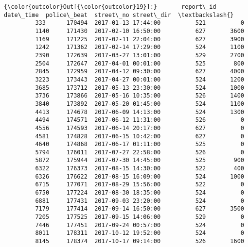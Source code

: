 \documentclass[11pt]{article}
\begin{document}
\begin{Verbatim}[commandchars=\\\{\}]
{\color{outcolor}Out[{\color{outcolor}19}]:}       report\_id            date\_time  police\_beat  street\_no street\_dir  \textbackslash{}
         333      170494  2017-01-13 17:44:00          521          0              
         1140     171430  2017-02-10 16:50:00          627       3600              
         1169     171225  2017-02-11 22:04:00          627       3900              
         1242     171362  2017-02-14 17:29:00          524       1100              
         2390     172639  2017-03-27 13:01:00          529       2700              
         2504     172647  2017-04-01 00:01:00          525        800              
         2845     172959  2017-04-12 09:30:00          627       4000              
         3223     173443  2017-04-27 00:01:00          524       1200              
         3685     173712  2017-05-13 23:30:00          524       1000              
         3736     173866  2017-05-16 10:35:00          526       1400              
         3840     173892  2017-05-20 01:45:00          524       1100              
         4413     174678  2017-06-09 14:13:00          524       1300              
         4494     174571  2017-06-12 11:31:00          526          0              
         4556     174593  2017-06-14 20:17:00          627          0              
         4581     174828  2017-06-15 10:42:00          627          0              
         4640     174868  2017-06-17 01:11:00          525          0              
         5794     176011  2017-07-27 22:58:00          526          0              
         5872     175944  2017-07-30 14:45:00          525        900              
         6322     176373  2017-08-15 14:30:00          522        400              
         6326     176622  2017-08-15 16:09:00          524       1000              
         6715     177071  2017-08-29 15:56:00          522          0              
         6750     177224  2017-08-30 18:35:00          524          0              
         6881     177431  2017-09-03 23:20:00          524          0              
         7179     177414  2017-09-14 16:50:00          627       3500              
         7205     177525  2017-09-15 14:06:00          529          0              
         7446     177451  2017-09-24 00:57:00          524          0              
         8011     178311  2017-10-12 19:52:00          524          0              
         8145     178374  2017-10-17 09:14:00          526       1600              

\end{Verbatim}
\end{document}
